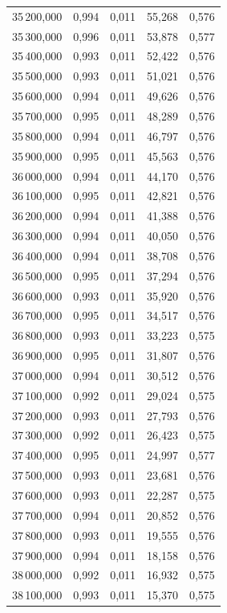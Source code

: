 \begin{longtable}{rrrrr}
35\,200,000 & 0,994 & 0,011 & 55,268 & 0,576\\
35\,300,000 & 0,996 & 0,011 & 53,878 & 0,577\\
35\,400,000 & 0,993 & 0,011 & 52,422 & 0,576\\
35\,500,000 & 0,993 & 0,011 & 51,021 & 0,576\\
35\,600,000 & 0,994 & 0,011 & 49,626 & 0,576\\
35\,700,000 & 0,995 & 0,011 & 48,289 & 0,576\\
35\,800,000 & 0,994 & 0,011 & 46,797 & 0,576\\
35\,900,000 & 0,995 & 0,011 & 45,563 & 0,576\\
36\,000,000 & 0,994 & 0,011 & 44,170 & 0,576\\
36\,100,000 & 0,995 & 0,011 & 42,821 & 0,576\\
36\,200,000 & 0,994 & 0,011 & 41,388 & 0,576\\
36\,300,000 & 0,994 & 0,011 & 40,050 & 0,576\\
36\,400,000 & 0,994 & 0,011 & 38,708 & 0,576\\
36\,500,000 & 0,995 & 0,011 & 37,294 & 0,576\\
36\,600,000 & 0,993 & 0,011 & 35,920 & 0,576\\
36\,700,000 & 0,995 & 0,011 & 34,517 & 0,576\\
36\,800,000 & 0,993 & 0,011 & 33,223 & 0,575\\
36\,900,000 & 0,995 & 0,011 & 31,807 & 0,576\\
37\,000,000 & 0,994 & 0,011 & 30,512 & 0,576\\
37\,100,000 & 0,992 & 0,011 & 29,024 & 0,575\\
37\,200,000 & 0,993 & 0,011 & 27,793 & 0,576\\
37\,300,000 & 0,992 & 0,011 & 26,423 & 0,575\\
37\,400,000 & 0,995 & 0,011 & 24,997 & 0,577\\
37\,500,000 & 0,993 & 0,011 & 23,681 & 0,576\\
37\,600,000 & 0,993 & 0,011 & 22,287 & 0,575\\
37\,700,000 & 0,994 & 0,011 & 20,852 & 0,576\\
37\,800,000 & 0,993 & 0,011 & 19,555 & 0,576\\
37\,900,000 & 0,994 & 0,011 & 18,158 & 0,576\\
38\,000,000 & 0,992 & 0,011 & 16,932 & 0,575\\
38\,100,000 & 0,993 & 0,011 & 15,370 & 0,575\\

\end{longtable}

